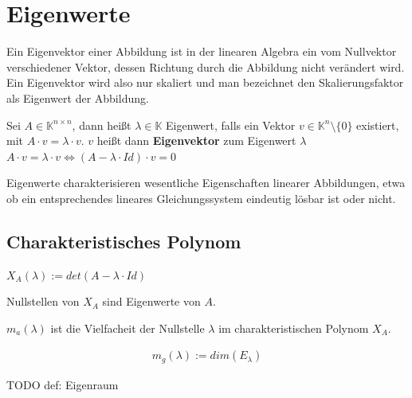 \documentclass{scrartcl}
\begin{document}
\newpage
\section{Eigenwerte}
\label{Eigenwert}
\begin{Def}
Ein Eigenvektor einer Abbildung ist in der linearen Algebra ein vom Nullvektor verschiedener Vektor, dessen Richtung durch die Abbildung nicht verändert wird. Ein Eigenvektor wird also nur skaliert und man bezeichnet den Skalierungsfaktor als Eigenwert der Abbildung.
\end{Def}

\begin{Def}
\label{Eigenvektor}
Sei $A \in \mathbb{K}^{n \times n} $, dann heißt $\lambda \in \mathbb{K} $ Eigenwert, falls ein Vektor $v \in \mathbb{K}^{n} \setminus \{0\} $ existiert, mit $A \cdot v = \lambda \cdot v$. $v$ heißt dann \textbf{Eigenvektor} zum Eigenwert $\lambda$\\

$A \cdot v = \lambda \cdot v \Leftrightarrow (A - \lambda \cdot Id) \cdot v = 0$ \\

\end{Def}

\begin{Notiz}
Eigenwerte charakterisieren wesentliche Eigenschaften linearer Abbildungen, etwa ob ein entsprechendes lineares Gleichungssystem eindeutig lösbar ist oder nicht.
\end{Notiz}

\subsection{Charakteristisches Polynom}
\begin{Def}
$X_A(\lambda) := det(A - \lambda \cdot Id)$
\end{Def}

\begin{Satz}
Nullstellen von $X_A$ sind Eigenwerte von $A$.
\end{Satz}

\begin{Def}
    $m_a(\lambda)$ ist die Vielfacheit der Nullstelle $\lambda$ im charakteristischen Polynom $X_A$.
\end{Def}

\begin{Def}
    \begin{align*}
        m_g(\lambda) := dim(E_\lambda)
    \end{align*}
\end{Def}
        TODO def: Eigenraum
\end{document}
